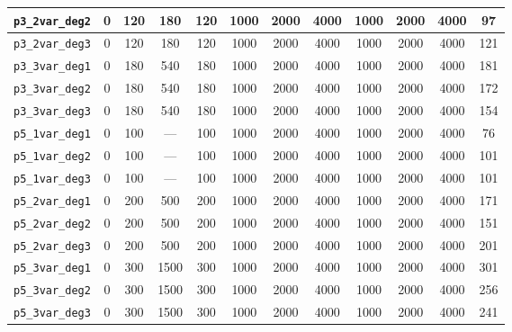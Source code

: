 \begin{landscape}
\begin{table}[H]
{\begin{tabular}{lccccccccccc}
\hline
\texttt{p3\_2var\_deg2} & 0 & 120 & 180 & 120 & 1000 & 2000 & 4000 & 1000 & 2000 & 4000 & 97 \\
\hline
\texttt{p3\_2var\_deg3} & 0 & 120 & 180 & 120 & 1000 & 2000 & 4000 & 1000 & 2000 & 4000 & 121 \\
\hline
\texttt{p3\_3var\_deg1} & 0 & 180 & 540 & 180 & 1000 & 2000 & 4000 & 1000 & 2000 & 4000 & 181 \\
\hline
\texttt{p3\_3var\_deg2} & 0 & 180 & 540 & 180 & 1000 & 2000 & 4000 & 1000 & 2000 & 4000 & 172 \\
\hline
\texttt{p3\_3var\_deg3} & 0 & 180 & 540 & 180 & 1000 & 2000 & 4000 & 1000 & 2000 & 4000 & 154 \\
\hline
\texttt{p5\_1var\_deg1} & 0 & 100 & --- & 100 & 1000 & 2000 & 4000 & 1000 & 2000 & 4000 & 76 \\
\hline
\texttt{p5\_1var\_deg2} & 0 & 100 & --- & 100 & 1000 & 2000 & 4000 & 1000 & 2000 & 4000 & 101 \\
\hline
\texttt{p5\_1var\_deg3} & 0 & 100 & --- & 100 & 1000 & 2000 & 4000 & 1000 & 2000 & 4000 & 101 \\
\hline
\texttt{p5\_2var\_deg1} & 0 & 200 & 500 & 200 & 1000 & 2000 & 4000 & 1000 & 2000 & 4000 & 171 \\
\hline
\texttt{p5\_2var\_deg2} & 0 & 200 & 500 & 200 & 1000 & 2000 & 4000 & 1000 & 2000 & 4000 & 151 \\
\hline
\texttt{p5\_2var\_deg3} & 0 & 200 & 500 & 200 & 1000 & 2000 & 4000 & 1000 & 2000 & 4000 & 201 \\
\hline
\texttt{p5\_3var\_deg1} & 0 & 300 & 1500 & 300 & 1000 & 2000 & 4000 & 1000 & 2000 & 4000 & 301 \\
\hline
\texttt{p5\_3var\_deg2} & 0 & 300 & 1500 & 300 & 1000 & 2000 & 4000 & 1000 & 2000 & 4000 & 256 \\
\hline
\texttt{p5\_3var\_deg3} & 0 & 300 & 1500 & 300 & 1000 & 2000 & 4000 & 1000 & 2000 & 4000 & 241 \\
\bottomrule
\end{tabular}
}%
\end{table}
\end{landscape}
